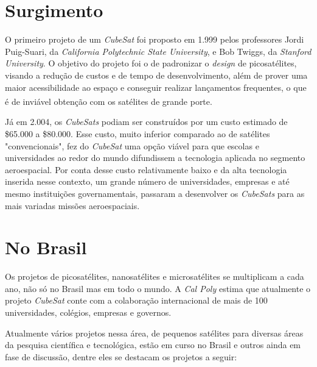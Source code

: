 \documentclass[
	12pt,				%
	openright,			%
	oneside,			%
	a4paper,			%
	english,			%
	french,				%
	spanish,			%
	brazil,				%
	oldfontcommands
	]{abntex2}
\begin{document}
\section[Surgimento]{Surgimento} 

	O primeiro projeto de um \textit{CubeSat} foi proposto em 1.999 pelos professores Jordi Puig-Suari, da \textit{California Polytechnic State University}, e Bob Twiggs, da \textit{Stanford University}. O objetivo do projeto foi o de padronizar o \textit{design} de picosatélites, visando a redução de custos e de tempo de desenvolvimento, além de prover uma maior acessibilidade ao espaço e conseguir realizar lançamentos frequentes, o que é de inviável obtenção com os satélites de grande porte.\textsuperscript{\cite{CubeSat}}
	
	Já em 2.004, os \textit{CubeSats} podiam ser construídos por um custo estimado de \$65.000 a \$80.000. Esse custo, muito inferior comparado ao de satélites "convencionais", fez do \textit{CubeSat} uma opção viável para que escolas e universidades ao redor do mundo difundissem a tecnologia aplicada no segmento aeroespacial. Por conta desse custo relativamente baixo e da alta tecnologia inserida nesse contexto, um grande número de universidades, empresas e até mesmo instituições governamentais, passaram a desenvolver os \textit{CubeSats} para as mais variadas missões aeroespaciais.

\section[No Brasil]{No Brasil}

	Os projetos de picosatélites, nanosatélites e microsatélites se multiplicam a cada ano, não só no Brasil mas em todo o mundo. A \textit{Cal Poly} estima que atualmente o projeto \textit{CubeSat} conte com a colaboração internacional de mais de 100 universidades, colégios, empresas e governos.
	
	Atualmente vários projetos nessa área, de pequenos satélites para diversas áreas da pesquisa científica e tecnológica, estão em curso no Brasil e outros ainda em fase de discussão, dentre eles se destacam os projetos a seguir:
	\pagebreak
	
\end{document}
